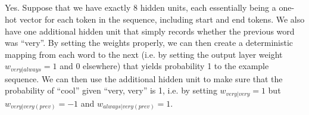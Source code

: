 \documentclass[psamsfonts]{amsart}
\theoremstyle{definition}
\theoremstyle{remark}
\numberwithin{equation}{section}
\begin{document}
\subsection{} Yes. Suppose that we have exactly $8$ hidden units, each essentially being a one-hot vector for each token in the sequence, including start and end tokens. We also have one additional hidden unit that simply records whether the previous word was ``very''. By setting the weights properly, we can then create a deterministic mapping from each word to the next (i.e. by setting the output layer weight $w_{very|always} = 1$ and 0 elsewhere) that yields probability 1 to the example sequence. We can then use the additional hidden unit to make sure that the probability of ``cool'' given ``very, very'' is 1, i.e. by setting $w_{very|very} = 1$ but $w_{very|very(prev)} = -1$ and $w_{always|very(prev)} = 1$.
\end{document}
